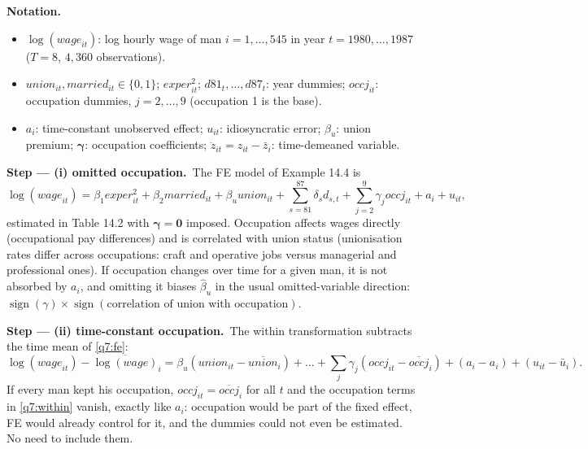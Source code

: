 \documentclass[11pt,a4paper]{article}
\numberwithin{equation}{questao}
\newenvironment{notacao}{\par\smallskip\noindent\textbf{Notation.}\begin{itemize}[leftmargin=1.4em,topsep=1pt,itemsep=0pt]\small}{\end{itemize}}
\newcommand{\passo}[2]{\par\smallskip\noindent\textbf{Step --- #1.}~#2}
\newcommand{\var}[1]{\mathit{#1}}
\begin{document}
\begin{sol}
\begin{notacao}
\item $\log(\var{wage}_{it})$: log hourly wage of man $i=1,\dots,545$ in year $t=1980,\dots,1987$ ($T=8$, $4{,}360$ observations).
\item $\var{union}_{it},\var{married}_{it}\in\{0,1\}$; $\var{exper}^2_{it}$; $d81_t,\dots,d87_t$: year dummies; $\var{occ}j_{it}$: occupation dummies, $j=2,\dots,9$ (occupation 1 is the base).
\item $a_i$: time-constant unobserved effect; $u_{it}$: idiosyncratic error; $\beta_u$: union premium; $\boldsymbol\gamma$: occupation coefficients; $\ddot z_{it}=z_{it}-\bar z_i$: time-demeaned variable.
\end{notacao}

\passo{(i) omitted occupation}{The FE model of Example 14.4 is
\begin{equation}
\log(\var{wage}_{it})=\beta_1\var{exper}^2_{it}+\beta_2\var{married}_{it}+\beta_u\var{union}_{it}+\textstyle\sum_{s=81}^{87}\delta_s d_{s,t}+\sum_{j=2}^{9}\gamma_j\var{occ}j_{it}+a_i+u_{it}, \label{q7:fe}
\end{equation}
estimated in Table 14.2 with $\boldsymbol\gamma=\mathbf0$ imposed. Occupation affects wages directly
(occupational pay differences) and is correlated with union status (unionisation rates differ across
occupations: craft and operative jobs versus managerial and professional ones). If occupation
changes over time for a given man, it is not absorbed by $a_i$, and omitting it biases $\hat\beta_u$
in the usual omitted-variable direction: $\operatorname{sign}(\gamma)\times\operatorname{sign}(\text{correlation of union with occupation})$.}

\passo{(ii) time-constant occupation}{The within transformation subtracts the time mean of \eqref{q7:fe}:
\begin{equation}
\log(\var{wage}_{it})-\overline{\log(\var{wage})}_i=\beta_u(\var{union}_{it}-\overline{\var{union}}_i)+\dots+\textstyle\sum_j\gamma_j(\var{occ}j_{it}-\overline{\var{occ}j}_i)+(a_i-a_i)+(u_{it}-\bar u_i). \label{q7:within}
\end{equation}
If every man kept his occupation, $\var{occ}j_{it}=\overline{\var{occ}j}_i$ for all $t$ and the
occupation terms in \eqref{q7:within} vanish, exactly like $a_i$: occupation would be part of the fixed
effect, FE would already control for it, and the dummies could not even be estimated. No need to include them.}


\end{sol}
\end{document}
